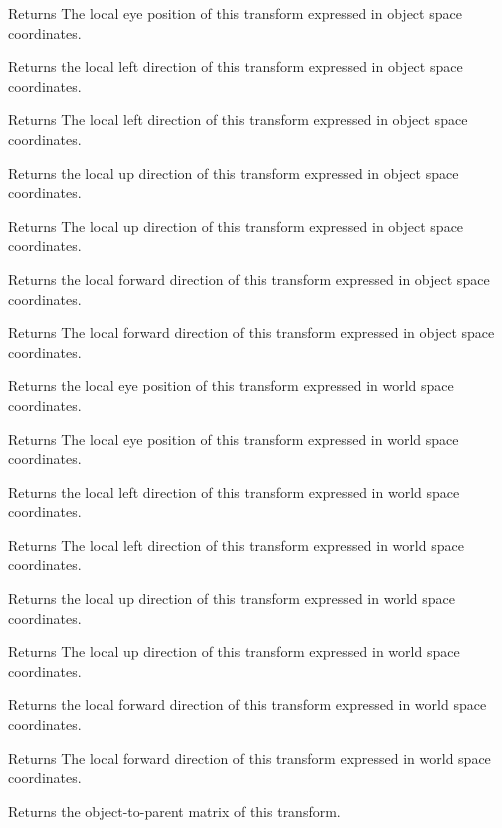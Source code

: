 \begin{DoxyReturn}{Returns}
The local eye position of this transform expressed in object space coordinates.
\end{DoxyReturn}
Returns the local left direction of this transform expressed in object space coordinates.

\begin{DoxyReturn}{Returns}
The local left direction of this transform expressed in object space coordinates.
\end{DoxyReturn}
Returns the local up direction of this transform expressed in object space coordinates.

\begin{DoxyReturn}{Returns}
The local up direction of this transform expressed in object space coordinates.
\end{DoxyReturn}
Returns the local forward direction of this transform expressed in object space coordinates.

\begin{DoxyReturn}{Returns}
The local forward direction of this transform expressed in object space coordinates.
\end{DoxyReturn}
Returns the local eye position of this transform expressed in world space coordinates.

\begin{DoxyReturn}{Returns}
The local eye position of this transform expressed in world space coordinates.
\end{DoxyReturn}
Returns the local left direction of this transform expressed in world space coordinates.

\begin{DoxyReturn}{Returns}
The local left direction of this transform expressed in world space coordinates.
\end{DoxyReturn}
Returns the local up direction of this transform expressed in world space coordinates.

\begin{DoxyReturn}{Returns}
The local up direction of this transform expressed in world space coordinates.
\end{DoxyReturn}
Returns the local forward direction of this transform expressed in world space coordinates.

\begin{DoxyReturn}{Returns}
The local forward direction of this transform expressed in world space coordinates.
\end{DoxyReturn}
Returns the object-\/to-\/parent matrix of this transform.


